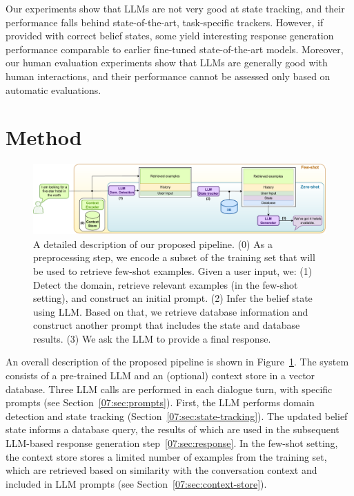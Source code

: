 Our experiments show that LLMs are not very good at state tracking, and their performance falls behind state-of-the-art, task-specific trackers.
However, if provided with correct belief states, some yield interesting response generation performance comparable to earlier fine-tuned state-of-the-art models.
Moreover, our human evaluation experiments show that LLMs are generally good with human interactions, and their performance cannot be assessed only based on automatic evaluations.

\section{Method}
\label{07:sec:method}
\begin{figure}[t]
    \centering
    \includegraphics[width=\textwidth]{images/llm-chatbot-v3.pdf}
    \caption{A detailed description of our proposed pipeline. (0) As a preprocessing step, we encode a subset of the training set that will be used to retrieve few-shot examples.
    Given a user input, we: (1) Detect the domain, retrieve relevant examples (in the few-shot setting), and construct an initial prompt. (2) Infer the belief state using LLM. Based on that, we retrieve database information and construct another prompt that includes the state and database results. (3) We ask the LLM to provide a final response.}
    \label{07:fig:overview_low_level}
\end{figure}
An overall description of the proposed pipeline is shown in Figure~\ref{07:fig:overview_low_level}.
The system consists of a pre-trained LLM and an (optional) context store in a vector database.
Three LLM calls are performed in each dialogue turn, with specific prompts (see Section~\ref{07:sec:prompts}).
First, the LLM performs domain detection and state tracking (Section~\ref{07:sec:state-tracking}).
The updated belief state informs a database query, the results of which are used in the subsequent LLM-based response generation step~\ref{07:sec:response}.
In the few-shot setting, the context store stores a limited number of examples from the training set, which are retrieved based on similarity with the conversation context and included in LLM prompts (see Section~\ref{07:sec:context-store}).


